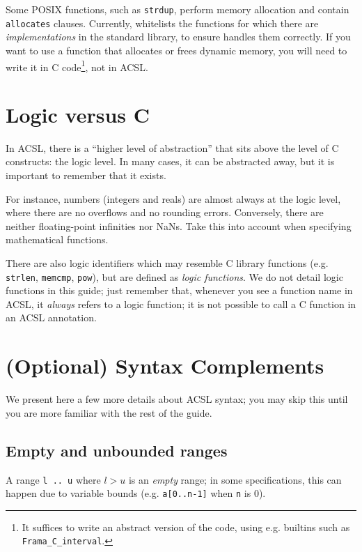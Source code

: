 \documentclass{frama-c-book}
\begin{document}
Some POSIX functions, such as \texttt{strdup}, perform memory allocation and
contain \texttt{allocates} clauses. Currently, \Eva{} whitelists the functions
for which there are {\em implementations} in the \FramaC standard library,
to ensure \Eva{} handles them correctly. If you want to use a function that
allocates or frees dynamic memory, you will need to write it in C
code\footnote{It suffices to write an abstract version of the code, using
e.g. \FramaC builtins such as \texttt{Frama\_C\_interval}.}, not in ACSL.

\section{Logic versus C}
\label{sec:acsl-guide-logic}

In ACSL, there is a ``higher level of abstraction'' that sits above the level
of C constructs: the logic level. In many cases, it can be abstracted away,
but it is important to remember that it exists.

For instance, numbers (integers and reals) are almost always at the logic
level, where there are no overflows and no rounding errors. Conversely,
there are neither floating-point infinities nor NaNs. Take this into account
when specifying mathematical functions.

There are also logic identifiers which may resemble C library functions
(e.g. \texttt{strlen}, \texttt{memcmp}, \texttt{pow}), but are defined
as {\em logic functions}. We do not detail logic functions in this guide;
just remember that, whenever you see a function name in ACSL,
it {\em always} refers to a logic function; it is not possible to call
a C function in an ACSL annotation.

\section{(Optional) Syntax Complements}
\label{sec:acsl-guide-complements}

We present here a few more details about ACSL syntax; you may skip this until
you are more familiar with the rest of the guide.

\subsection*{Empty and unbounded ranges}

A range \texttt{l .. u} where $l > u$ is an {\em empty} range; in some
specifications, this can happen due to variable bounds
(e.g. \texttt{a[0..n-1]} when \texttt{n} is 0).
\end{document}
